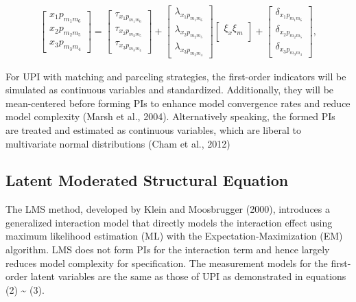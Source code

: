 \documentclass[
  man]{apa6}
\begin{document}
\begin{align}
    \begin{bmatrix}
        x_{1}p_{m_{1}m_{6}} \\
        x_{2}p_{m_{2}m_{5}} \\ 
        x_{3}p_{m_{3}m_{4}}
    \end{bmatrix} =
    \begin{bmatrix}
        \tau_{x_{1}p_{m_{1}m_{6}}} \\
        \tau_{x_{2}p_{m_{2}m_{5}}} \\ 
        \tau_{x_{3}p_{m_{3}m_{4}}}
    \end{bmatrix} +
    \begin{bmatrix}
        \lambda_{x_{1}p_{m_{1}m_{6}}} \\
        \lambda_{x_{2}p_{m_{2}m_{5}}} \\ 
        \lambda_{x_{3}p_{m_{3}m_{4}}}
    \end{bmatrix}
    \begin{bmatrix}
        \xi_{x}\xi_{m} \\
    \end{bmatrix} +
    \begin{bmatrix}
        \delta_{x_{1}p_{m_{1}m_{6}}} \\
        \delta_{x_{2}p_{m_{2}m_{5}}} \\ 
        \delta_{x_{3}p_{m_{3}m_{4}}}
    \end{bmatrix},
\end{align}

For UPI with matching and parceling strategies, the first-order indicators will be simulated as continuous variables and standardized. Additionally, they will be mean-centered before forming PIs to enhance model convergence rates and reduce model complexity (Marsh et al., 2004). Alternatively speaking, the formed PIs are treated and estimated as continuous variables, which are liberal to multivariate normal distributions (Cham et al., 2012)

\hypertarget{latent-moderated-structural-equation}{%
\subsection{Latent Moderated Structural Equation}\label{latent-moderated-structural-equation}}

The LMS method, developed by Klein and Moosbrugger (2000), introduces a generalized interaction model that directly models the interaction effect using maximum likelihood estimation (ML) with the Expectation-Maximization (EM) algorithm. LMS does not form PIs for the interaction term and hence largely reduces model complexity for specification. The measurement models for the first-order latent variables are the same as those of UPI as demonstrated in equations (2) \textasciitilde{} (3).
\end{document}
